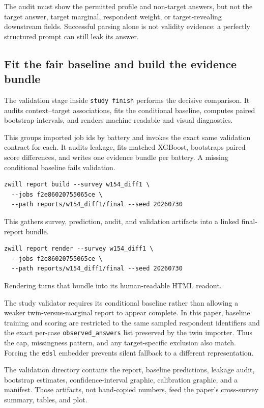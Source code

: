 \documentclass[11pt]{article}
\begin{document}
The audit must show the permitted profile and non-target answers, but not the
target answer, target marginal, respondent weight, or target-revealing
downstream fields. Successful parsing alone is not validity evidence: a
perfectly structured prompt can still leak its answer.

\subsection{Fit the fair baseline and build the evidence bundle}
The validation stage inside \texttt{study finish} performs the decisive comparison. It audits
context--target associations, fits the conditional baseline, computes paired
bootstrap intervals, and renders machine-readable and visual diagnostics.

This groups imported job ids by battery and invokes the exact same validation
contract for each. It audits leakage, fits matched XGBoost, bootstraps paired
score differences, and writes one evidence bundle per battery. A missing
conditional baseline fails validation.

\begin{lstlisting}[style=shell]
zwill report build --survey w154_diff1 \
  --jobs f2e86020755065ce \
  --path reports/w154_diff1/final --seed 20260730
\end{lstlisting}
This gathers survey, prediction, audit, and validation artifacts into a linked
final-report bundle.

\begin{lstlisting}[style=shell]
zwill report render --survey w154_diff1 \
  --jobs f2e86020755065ce \
  --path reports/w154_diff1/final --seed 20260730
\end{lstlisting}
Rendering turns that bundle into its human-readable HTML readout.

The study validator requires its conditional baseline rather than allowing a
weaker twin-versus-marginal report to appear complete. In this paper, baseline
training and scoring are restricted to the same sampled
respondent identifiers and the exact per-case \texttt{observed\_answers} list
preserved by the twin importer. Thus the cap, missingness pattern, and any
target-specific exclusion also match. Forcing the \texttt{edsl} embedder
prevents silent fallback to a different representation.

The validation directory contains the report, baseline predictions, leakage
audit, bootstrap estimates, confidence-interval graphic, calibration graphic,
and a manifest. Those artifacts, not hand-copied numbers, feed the paper's
cross-survey summary, tables, and plot.
\end{document}
